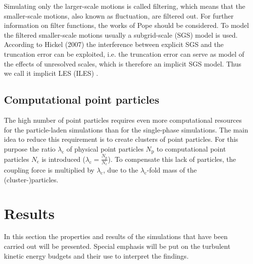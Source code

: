 \documentclass[11pt,a4paper,openany,oneside,parskip=half*]{article}
\begin{document}
Simulating only the larger-scale motions is called filtering, which means that the smaller-scale motions, also known as fluctuation, are filtered out. For further information on filter functions, the works of Pope \cite{turbulentFlows} should be considered. To model the filtered smaller-scale motions usually a subgrid-scale (SGS) model is used. According to Hickel (2007) the interference between explicit SGS and the truncation error can be exploited, i.e. the truncation error can serve as model of the effects of unresolved scales, which is therefore an implicit SGS model. Thus we call it implicit LES (ILES) \cite{implicitLES}. %
\subsection{Computational point particles}
The high number of point particles requires even more computational resources for the particle-laden simulations than for the single-phase simulations. The main idea to reduce this requirement is to create clusters of point particles. For this purpose the ratio $\lambda_\mathrm{c}$ of physical point particles $N_\mathrm{p}$ to computational point particles $N_\mathrm{c}$ is introduced ($\lambda_\mathrm{c} = \frac{N_\mathrm{p}}{N_\mathrm{c}}$). To compensate this lack of particles, the coupling force is multiplied by $\lambda_\mathrm{c}$, due to the $\lambda_\mathrm{c}$-fold mass of the (cluster-)particles.
\pagebreak
\section{Results}
In this section the properties and results of the simulations that have been carried out will be presented. Special emphasis will be put on the turbulent kinetic energy budgets and their use to interpret the findings.
\end{document}
